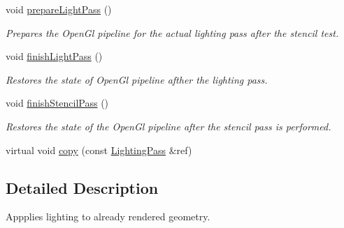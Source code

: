 \begin{DoxyCompactItemize}
\mbox{\label{class_geometry_engine_1_1_geometry_render_step_1_1_lighting_pass_aab66c6267b48f6ddb6c867303bd5dab1}} 
void \mbox{\hyperlink{class_geometry_engine_1_1_geometry_render_step_1_1_lighting_pass_aab66c6267b48f6ddb6c867303bd5dab1}{prepare\+Light\+Pass}} ()
\begin{DoxyCompactList}\small\item\em Prepares the Open\+Gl pipeline for the actual lighting pass after the stencil test. \end{DoxyCompactList}\item 
\mbox{\label{class_geometry_engine_1_1_geometry_render_step_1_1_lighting_pass_a6d5e908865443b942b83362bf2d8a081}} 
void \mbox{\hyperlink{class_geometry_engine_1_1_geometry_render_step_1_1_lighting_pass_a6d5e908865443b942b83362bf2d8a081}{finish\+Light\+Pass}} ()
\begin{DoxyCompactList}\small\item\em Restores the state of Open\+Gl pipeline afther the lighting pass. \end{DoxyCompactList}\item 
\mbox{\label{class_geometry_engine_1_1_geometry_render_step_1_1_lighting_pass_aa809dc069c363993224df44cf44842bb}} 
void \mbox{\hyperlink{class_geometry_engine_1_1_geometry_render_step_1_1_lighting_pass_aa809dc069c363993224df44cf44842bb}{finish\+Stencil\+Pass}} ()
\begin{DoxyCompactList}\small\item\em Restores the state of the Open\+Gl pipeline after the stencil pass is performed. \end{DoxyCompactList}\item 
virtual void \mbox{\hyperlink{class_geometry_engine_1_1_geometry_render_step_1_1_lighting_pass_a4865616b03a872033a6f9abc5c370374}{copy}} (const \mbox{\hyperlink{class_geometry_engine_1_1_geometry_render_step_1_1_lighting_pass}{Lighting\+Pass}} \&ref)
\end{DoxyCompactItemize}


\subsection{Detailed Description}
Appplies lighting to already rendered geometry. 

